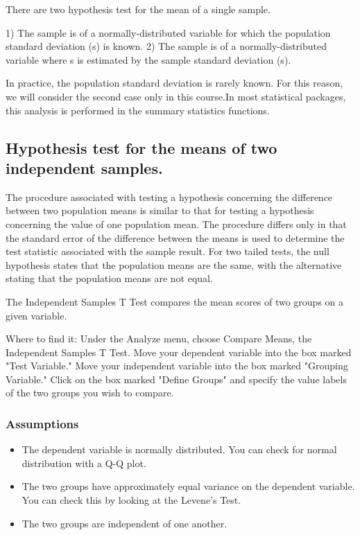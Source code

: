 There are two hypothesis test for the mean of a single sample.

1) The sample is of a normally-distributed variable for which the population standard deviation (s) is known.
2) The sample is of a normally-distributed variable where s is estimated by the sample standard deviation (s).

In practice, the population standard deviation is rarely known. For this reason, we will consider the second case only in this course.In most statistical packages, this analysis is performed in the summary statistics functions.

\subsection{Hypothesis test for the means of two independent samples.}
The procedure associated with testing a hypothesis concerning the difference between two population means is similar to that for testing a hypothesis concerning the value of one population mean. The procedure differs only in that the standard error of the difference between the means is used to determine the test statistic associated with the sample result. For two tailed tests, the null hypothesis states that the population means are the same, with the alternative stating that the population means are not equal.


The Independent Samples T Test compares the mean scores of two groups on a given variable.

Where to find it: Under the Analyze menu, choose Compare Means, the Independent Samples T Test. Move your dependent variable into the box marked "Test Variable." Move your independent variable into the box marked "Grouping Variable." Click on the box marked "Define Groups" and specify the value labels of the two groups you wish to compare.

\subsubsection{Assumptions}
\begin{itemize}
\item The dependent variable is normally distributed. You can check for normal distribution with a Q-Q plot.
\item The two groups have approximately equal variance on the dependent variable. You can check this by looking at the Levene's Test.
\item The two groups are independent of one another.
\end{itemize}

